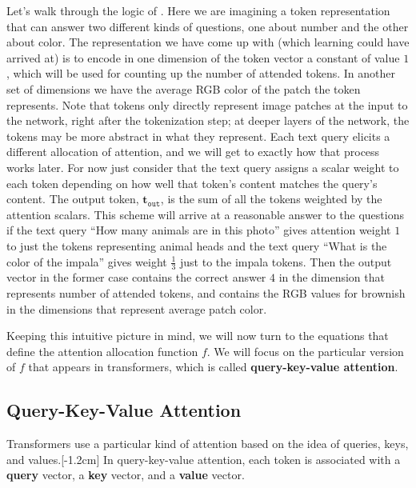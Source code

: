 Let's walk through the logic of \fig{\ref{fig:transformers:attention_layer_safari_query_cartoon}}. Here we are imagining a token representation that can answer two different kinds of questions, one about number and the other about color. The representation we have come up with (which learning could have arrived at) is to encode in one dimension of the token vector a constant of value $1$, which will be used for counting up the number of attended tokens. In another set of dimensions we have the average RGB color of the patch the token represents. Note that tokens only directly represent image patches at the input to the network, right after the tokenization step; at deeper layers of the network, the tokens may be more abstract in what they represent. Each text query elicits a different allocation of attention, and we will get to exactly how that process works later. For now just consider that the text query assigns a scalar weight to each token depending on how well that token's content matches the query's content. The output token, $\mathbf{t}_{\texttt{out}}$, is the sum of all the tokens weighted by the attention scalars. This scheme will arrive at a reasonable answer to the questions if the text query ``How many animals are in this photo'' gives attention weight $1$ to just the tokens representing animal heads and the text query ``What is the color of the impala'' gives weight $\frac{1}{3}$ just to the impala tokens. Then the output vector in the former case contains the correct answer $4$ in the dimension that represents number of attended tokens, and contains the RGB values for brownish in the dimensions that represent average patch color.


Keeping this intuitive picture in mind, we will now turn to the equations that define the attention allocation function $f$. We will focus on the particular version of $f$ that appears in transformers, which is called \textbf{query-key-value attention}.

\subsection{Query-Key-Value Attention}
Transformers use a particular kind of attention based on the idea of queries, keys, and values.[-1.2cm] In query-key-value attention, each token is associated with a \textbf{query} vector, a \textbf{key} vector, and a \textbf{value} vector.

